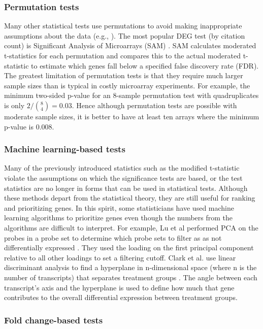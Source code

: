 \subsubsection{Permutation tests}
Many other statistical tests use permutations to avoid
making inappropriate assumptions about the data (e.g., \cite{Yan:2005tc, Efron:2001uu}).
The most popular DEG test (by citation count) is Significant
Analysis of Microarrays (SAM) \cite{Tusher:2001kk}. SAM calculates moderated t-statistics
for each permutation and compares this to the actual moderated t-statistic
to estimate which genes fall below a specified 
false discovery rate (FDR).
The greatest limitation of permutation tests is that they
require much larger sample sizes than is typical in
costly microarray experiments. For example, the minimum
two-sided p-value for an 8-sample permutation test with quadruplicates
is only $2/{8 \choose 4}=0.03$. Hence although permutation tests
are possible with moderate sample sizes, it is better to have at 
least ten arrays where the minimum p-value is 0.008.


\subsubsection{Machine learning-based tests}
Many of the previously introduced statistics such as the 
modified t-statistic violate the assumptions on which the significance tests
are based, or the test statistics are no longer in forms
that can be used in statistical tests.
Although these methods depart from the statistical
theory, they are still useful
for ranking and prioritizing genes. In this spirit,
some statisticians have used machine learning algorithms
to prioritize genes even though the numbers from the
algorithms are difficult to interpret. For example, Lu et al
performed PCA on the probes in a probe set to determine
which probe sets to filter as as not differentially expressed \cite{Lu:2011ba}. They used the
loading on the first principal component relative to
all other loadings to set a filtering cutoff.
Clark et al. use linear discriminant analysis to find
a hyperplane in n-dimensional space (where n is the number of transcripts)
that separates treatment groups \cite{Clark:2014du}. 
The angle between each transcript's axis
and the hyperplane is used to define how much that gene contributes to the overall
differential expression between treatment groups.


\subsubsection{Fold change-based tests}

